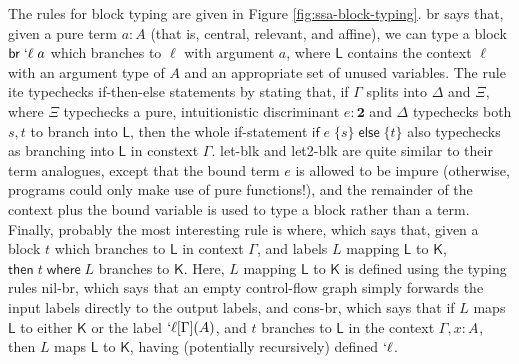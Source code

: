 \documentclass[acmsmall,screen,review]{acmart}
\newcommand{\mb}[1]{\ensuremath{\mathbf{#1}}}
\newcommand{\ms}[1]{\ensuremath{\mathsf{#1}}}
\newcommand{\lbl}[1]{{`#1}}
\newcommand{\brb}[2]{\ms{br}\;#1\;#2}
\newcommand{\lbrb}[2]{\brb{\lbl{#1}}{#2}}
\newcommand{\ite}[3]{\ms{if}\;#1\;\{#2\}\;\ms{else}\;\{#3\}}
\newcommand{\ewhere}[2]{\ms{then}\;#1\;\ms{where}\;#2}
\newcommand{\thyp}[3]{#1: {#2}^{#3}}
\newcommand{\rle}[1]{{\scriptsize\textsf{#1}}}
\begin{document}
The rules for block typing are given in Figure \ref{fig:ssa-block-typing}.
\rle{br} says that, given a pure term \(a: A\) (that is, central, relevant, and
affine), we can type a block \(\lbrb{\ell}{a}\) which branches to \(\ell\) with
argument \(a\), where \(\ms{L}\) contains the context \(\ell\) with an argument
type of \(A\) and an appropriate set of unused variables. The rule \rle{ite}
typechecks if-then-else statements by stating that, if \(\Gamma\) splits into
\(\Delta\) and \(\Xi\), where \(\Xi\) typechecks a pure, intuitionistic
discriminant \(e: \mb{2}\) and \(\Delta\) typechecks both \(s, t\) to branch
into \(\ms{L}\), then the whole if-statement \(\ite{e}{s}{t}\) also typechecks
as branching into \(\ms{L}\) in constext \(\Gamma\). \rle{let-blk} and
\rle{let2-blk} are quite similar to their term analogues, except that the
bound term \(e\) is allowed to be impure (otherwise, programs could only
make use of pure functions!), and the remainder of the context plus the bound
variable is used to type a block rather than a term. Finally, probably the most
interesting rule is \rle{where}, which says that, given a block \(t\) which
branches to \(\ms{L}\) in context \(\Gamma\), and labels \(L\) mapping
\(\ms{L}\) to \(\ms{K}\), \(\ewhere{t}{L}\) branches to \(\ms{K}\). Here, \(L\)
mapping \(\ms{L}\) to \(\ms{K}\) is defined using the typing rules \rle{nil-br},
which says that an empty control-flow graph simply forwards the input labels
directly to the output labels, and \rle{cons-br}, which says that if \(L\) maps
\(\ms{L}\) to either \(\ms{K}\) or the label \(\lbl{\ell}[\Gamma](A)\), and
\(t\) branches to \(\ms{L}\) in the context \(\Gamma, \thyp{x}{A}{}\), then
\(L\) maps \(\ms{L}\) to \(\ms{K}\), having (potentially recursively) defined
\(\lbl{\ell}\).
\end{document}
